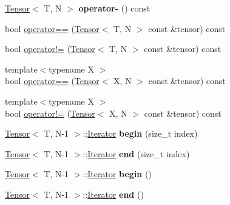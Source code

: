 \begin{DoxyCompactItemize}
\item 
\hyperlink{classtensor_1_1Tensor}{Tensor}$<$ T, N $>$ {\bfseries operator-\/} () const \hypertarget{classtensor_1_1Tensor_a6ce8a5f0bd2e4039af8de2c6388b86ce}{}\label{classtensor_1_1Tensor_a6ce8a5f0bd2e4039af8de2c6388b86ce}

\item 
bool \hyperlink{classtensor_1_1Tensor_a9488658b562b622bda64a26b8d6dfa3b}{operator==} (\hyperlink{classtensor_1_1Tensor}{Tensor}$<$ T, N $>$ const \&tensor) const 
\item 
bool \hyperlink{classtensor_1_1Tensor_a534cf82af969e8289df6346d4af4da93}{operator!=} (\hyperlink{classtensor_1_1Tensor}{Tensor}$<$ T, N $>$ const \&tensor) const 
\item 
{\footnotesize template$<$typename X $>$ }\\bool \hyperlink{classtensor_1_1Tensor_a494681b92fd48be1cb1c14d97df8f861}{operator==} (\hyperlink{classtensor_1_1Tensor}{Tensor}$<$ X, N $>$ const \&tensor) const 
\item 
{\footnotesize template$<$typename X $>$ }\\bool \hyperlink{classtensor_1_1Tensor_a236c88d3d0f0dd93c4a6ba6186cfeab5}{operator!=} (\hyperlink{classtensor_1_1Tensor}{Tensor}$<$ X, N $>$ const \&tensor) const 
\item 
\hyperlink{classtensor_1_1Tensor}{Tensor}$<$ T, N-\/1 $>$\+::\hyperlink{classtensor_1_1Tensor_1_1Iterator}{Iterator} {\bfseries begin} (size\+\_\+t index)\hypertarget{classtensor_1_1Tensor_ade2f10b699d8a3a3844add428899501b}{}\label{classtensor_1_1Tensor_ade2f10b699d8a3a3844add428899501b}

\item 
\hyperlink{classtensor_1_1Tensor}{Tensor}$<$ T, N-\/1 $>$\+::\hyperlink{classtensor_1_1Tensor_1_1Iterator}{Iterator} {\bfseries end} (size\+\_\+t index)\hypertarget{classtensor_1_1Tensor_a837fe2d92f35c1cf284dd9e17cd3cc9e}{}\label{classtensor_1_1Tensor_a837fe2d92f35c1cf284dd9e17cd3cc9e}

\item 
\hyperlink{classtensor_1_1Tensor}{Tensor}$<$ T, N-\/1 $>$\+::\hyperlink{classtensor_1_1Tensor_1_1Iterator}{Iterator} {\bfseries begin} ()\hypertarget{classtensor_1_1Tensor_acd3e58eb40c53cf89fa5ce1e75f28aa5}{}\label{classtensor_1_1Tensor_acd3e58eb40c53cf89fa5ce1e75f28aa5}

\item 
\hyperlink{classtensor_1_1Tensor}{Tensor}$<$ T, N-\/1 $>$\+::\hyperlink{classtensor_1_1Tensor_1_1Iterator}{Iterator} {\bfseries end} ()\hypertarget{classtensor_1_1Tensor_ae36fdec96cac221feca56ec41265e0dd}{}\label{classtensor_1_1Tensor_ae36fdec96cac221feca56ec41265e0dd}


\end{DoxyCompactItemize}
